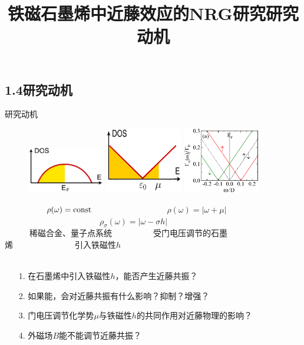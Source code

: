 \documentclass[9pt,t]{beamer} %
\begin{document}
\subsection{1.4研究动机}
\title{铁磁石墨烯中近藤效应的NRG研究\qquad \qquad \qquad \qquad 研究动机}
\begin{frame}{研究动机}
\begin{figure}
\includegraphics[width=0.3\textwidth,height=0.25\textwidth]{metal-dos.png}
\includegraphics[width=0.3\textwidth,height=0.25\textwidth]{gated-dos.png}
\includegraphics[width=0.3\textwidth,height=0.25\textwidth]{hyb1.png}
\end{figure}
~~~~~~~~~~$\rho(\omega)=\rm{const}$~~~~~~~~~~~~~~~~~~$\rho(\omega)=|\omega+\mu|$~~~~~~~~~~~~~~~~~~~~~~~$\rho_{\sigma}(\omega)=|\omega-\sigma h|$\\
~~~~~~稀磁合金、量子点系统~~~~~~~~~~受门电压调节的石墨烯~~~~~~~~~~~~~~~引入铁磁性$h$\\ \ \\
\begin{itemize}
\setlength\itemsep{0.4em}
\item[1.] 在石墨烯中引入铁磁性$h$，能否产生近藤共振？
\item[2.] 如果能，会对近藤共振有什么影响？抑制？增强？
\item[3.] 门电压调节化学势$\mu$与铁磁性$h$的共同作用对近藤物理的影响？
\item[4.] 外磁场$B$能不能调节近藤共振？
\end{itemize}
\end{frame}
\end{document}
